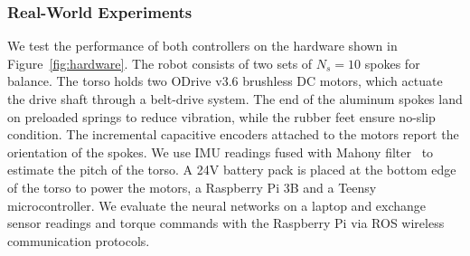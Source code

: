 \subsubsection{Real-World Experiments}

%
We test the performance of both controllers on the hardware shown in
Figure~\ref{fig:hardware}.
%
The robot consists of two sets of $N_s=10$ spokes for balance.
%
The torso holds two ODrive v3.6 brushless DC motors, which actuate the drive
shaft through a belt-drive system.
%
The end of the aluminum spokes land on preloaded springs to reduce vibration,
while the rubber feet ensure no-slip condition.
%
The incremental capacitive encoders attached to the motors report the
orientation of the spokes.
%
We use IMU readings fused with Mahony filter~\cite{mahony2008nonlinear} to estimate
the pitch of the torso.
%
A 24V battery pack is placed at the bottom edge of the torso to power
the motors, a Raspberry Pi 3B and a Teensy microcontroller.
%
We evaluate the neural networks on a laptop and exchange sensor readings and
torque commands with the Raspberry Pi via ROS wireless communication protocols.


